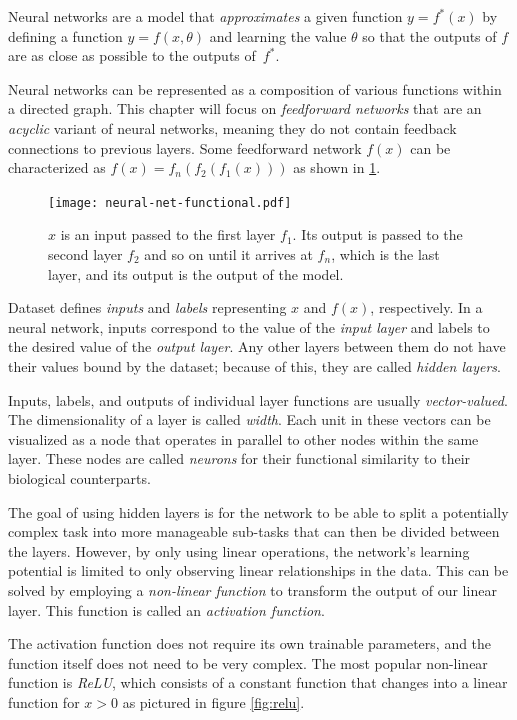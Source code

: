 \medskip

Neural networks are a model that \emph{approximates} a given function $y = f^{*}(x)$ by defining a function $y = f(x,\theta)$ and learning the value $\theta$ so that the outputs of $f$ are as close as possible to the outputs of~$f^{*}$.

Neural networks can be represented as a composition of various functions within a directed graph. This chapter will focus on \emph{feedforward networks} that are an \emph{acyclic} variant of neural networks, meaning they do not contain feedback connections to previous layers. Some feedforward network $f(x)$ can be characterized as $f(x) = f_{n}(f_{2}(f_{1}(x)))$ as shown in \ref{fig:nn-functional}.

\begin{figure}[ht]
  \centering
  \texttt{[image: neural-net-functional.pdf]}
  \caption{$x$ is an input passed to the first layer $f_{1}$. Its output is passed to the second layer $f_{2}$ and so on until it arrives at $f_{n}$, which is the last layer, and its output is the output of the model.}
  \label{fig:nn-functional}
\end{figure}

Dataset defines \emph{inputs} and \emph{labels} representing $x$ and $f(x)$, respectively. In a neural network, inputs correspond to the value of the \emph{input layer} and labels to the desired value of the \emph{output layer}. Any other layers between them do not have their values bound by the dataset; because of this, they are called \emph{hidden layers}.

Inputs, labels, and outputs of individual layer functions are usually \emph{vector-valued}. The dimensionality of a layer is called \emph{width}. Each unit in these vectors can be visualized as a node that operates in parallel to other nodes within the same layer. These nodes are called \emph{neurons} for their functional similarity to their biological counterparts.

\medskip
The goal of using hidden layers is for the network to be able to split a potentially complex task into more manageable sub-tasks that can then be divided between the layers. However, by only using linear operations, the network's learning potential is limited to only observing linear relationships in the data. This can be solved by employing a \emph{non-linear function} to transform the output of our linear layer. This function is called an \emph{activation function}.

The activation function does not require its own trainable parameters, and the function itself does not need to be very complex. The most popular non-linear function is \emph{ReLU}, which consists of a constant function that changes into a linear function for $x > 0$ as pictured in figure \ref{fig:relu}.

